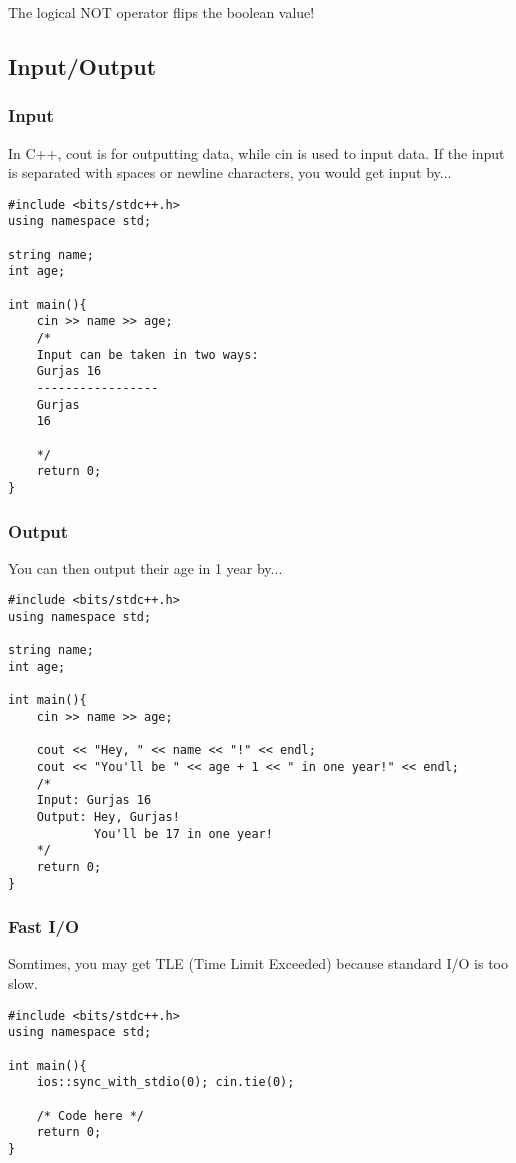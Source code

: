 \documentclass{report}
\begin{document}
\begin{principle}
The logical NOT operator flips the boolean value!    
\end{principle}

\subsection{Input/Output}

\subsubsection{Input}
In C++, cout is for outputting data, while cin is used to input data. If the input is separated with spaces or newline characters, you would get input by...

\begin{lstlisting}[caption=Input]
#include <bits/stdc++.h>
using namespace std;

string name;
int age; 

int main(){
    cin >> name >> age;
    /* 
    Input can be taken in two ways:  
    Gurjas 16 
    -----------------
    Gurjas
    16
    
    */
    return 0;
}
\end{lstlisting}

\subsubsection{Output}
You can then output their age in 1 year by...
\begin{lstlisting}[caption=Output]
#include <bits/stdc++.h>
using namespace std;

string name;
int age; 

int main(){
    cin >> name >> age;

    cout << "Hey, " << name << "!" << endl;
    cout << "You'll be " << age + 1 << " in one year!" << endl;
    /*
    Input: Gurjas 16
    Output: Hey, Gurjas!
            You'll be 17 in one year!
    */
    return 0;
}
\end{lstlisting}

\subsubsection{Fast I/O}
Somtimes, you may get TLE (Time Limit Exceeded) because standard I/O is too slow.

\begin{lstlisting}[caption=Fast I/O (New Template)]
#include <bits/stdc++.h>
using namespace std;

int main(){
    ios::sync_with_stdio(0); cin.tie(0);

    /* Code here */
    return 0;
}
\end{lstlisting}
\end{document}
